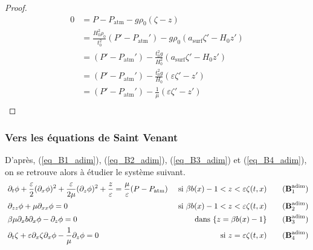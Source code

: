 \documentclass[12pt,a4paper]{article}
\numberwithin{equation}{section}
\begin{document}
\begin{proof}
    \begin{equation*}
        \begin{split}
            0 &= P - P_\text{atm} - g\rho_0(\zeta - z)\\
            &= \frac{H_0^2\rho_0}{t_0^2}\left(P' - P_\text{atm}'\right) - g\rho_0\left(a_\text{surf}\zeta' - H_0z'\right)\\
            &= \left(P' - P_\text{atm}'\right) - \frac{t_0^2g}{H_0^2}\left(a_\text{surf}\zeta' - H_0z'\right)\\
            &= \left(P' - P_\text{atm}'\right) - \frac{t_0^2g}{H_0}\left(\varepsilon\zeta' - z'\right)\\
            &= \left(P' - P_\text{atm}'\right) -\frac{1}{\mu}\left(\varepsilon\zeta' - z'\right)\\
        \end{split}
    \end{equation*}
\end{proof}
\subsubsection{Vers les équations de Saint Venant}

D'après, (\ref{eq_B1_adim}), (\ref{eq_B2_adim}), (\ref{eq_B3_adim}) et (\ref{eq_B4_adim}), on se retrouve alors à étudier le système suivant.
\begin{align}
~&\partial_{t} \phi + 
     \frac{\varepsilon}{2}(\partial_{x}\phi)^2+ \frac{\varepsilon}{2\mu}(\partial_{z}\phi)^2
     + \frac{z}{\varepsilon} 
     = \frac{\mu}{\varepsilon}(P-P_\text{atm}) &\text{ si } \beta b(x) -1 < z < \varepsilon \zeta(t,x) \label{eq_1k1}\tag{$\textbf{B}^{\text{adim}}_1$}\\
~&\partial_{zz}\phi + \mu \partial_{x x}\phi  = 0  &\text{ si } \beta b(x) -1 < z < \varepsilon \zeta(t,x) \label{eq_1k2}\tag{$\textbf{B}^{\text{adim}}_2$}\\
~&\beta \mu \partial_{x} b  \partial_{x}\phi   - \partial_{z}\phi = 0& \text{dans }\{z = \beta b(x) - 1\}\label{eq_1k3} \tag{$\textbf{B}^{\text{adim}}_3$}\\
~&\partial_{t}\zeta +  \varepsilon \partial_{x} \zeta  \partial_{x}\phi  - \frac{1}{\mu}\partial_{z}\phi = 0 &\text{ si } z = \varepsilon \zeta(t,x)\label{eq_1k4} \tag{$\textbf{B}^{\text{adim}}_4$}
\end{align}
\end{document}
